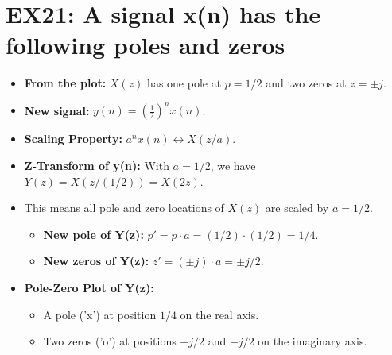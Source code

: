 \documentclass[a4paper,12pt]{article}
\begin{document}
\section*{EX21: A signal x(n) has the following poles and zeros}
\begin{itemize}
    \item \textbf{From the plot:} $X(z)$ has one pole at $p=1/2$ and two zeros at $z = \pm j$.
    \item \textbf{New signal:} $y(n) = (\frac{1}{2})^n x(n)$.
    \item \textbf{Scaling Property:} $a^n x(n) \leftrightarrow X(z/a)$.
    \item \textbf{Z-Transform of y(n):} With $a=1/2$, we have $Y(z) = X(z/(1/2)) = X(2z)$.
    \item This means all pole and zero locations of $X(z)$ are scaled by $a=1/2$.
        \begin{itemize}
            \item \textbf{New pole of Y(z):} $p' = p \cdot a = (1/2) \cdot (1/2) = 1/4$.
            \item \textbf{New zeros of Y(z):} $z' = (\pm j) \cdot a = \pm j/2$.
        \end{itemize}
    \item \textbf{Pole-Zero Plot of Y(z):}
        \begin{itemize}
            \item A pole ('x') at position $1/4$ on the real axis.
            \item Two zeros ('o') at positions $+j/2$ and $-j/2$ on the imaginary axis.
        \end{itemize}
\end{itemize}
\end{document}
